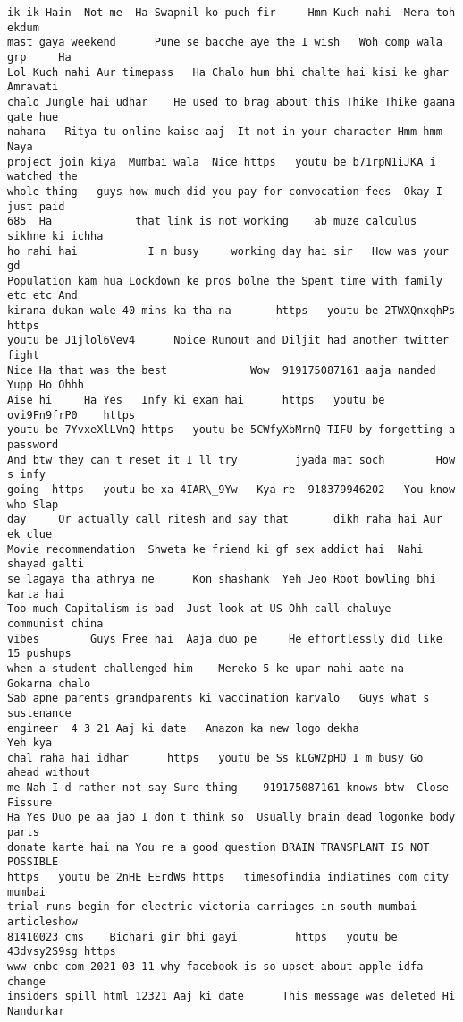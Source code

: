 \documentclass[11pt]{article}
\begin{document}
\begin{tcolorbox}[breakable, size=fbox, boxrule=.5pt, pad at break*=1mm, opacityfill=0]
\begin{Verbatim}[commandchars=\\\{\}]
ik ik Hain  Not me  Ha Swapnil ko puch fir     Hmm Kuch nahi  Mera toh ekdum
mast gaya weekend      Pune se bacche aye the I wish   Woh comp wala grp     Ha
Lol Kuch nahi Aur timepass   Ha Chalo hum bhi chalte hai kisi ke ghar Amravati
chalo Jungle hai udhar    He used to brag about this Thike Thike gaana gate hue
nahana   Ritya tu online kaise aaj  It not in your character Hmm hmm Naya
project join kiya  Mumbai wala  Nice https   youtu be b71rpN1iJKA i watched the
whole thing   guys how much did you pay for convocation fees  Okay I just paid
685  Ha             that link is not working    ab muze calculus sikhne ki ichha
ho rahi hai           I m busy     working day hai sir   How was your gd
Population kam hua Lockdown ke pros bolne the Spent time with family etc etc And
kirana dukan wale 40 mins ka tha na       https   youtu be 2TWXQnxqhPs https
youtu be J1jlol6Vev4      Noice Runout and Diljit had another twitter fight
Nice Ha that was the best             Wow  919175087161 aaja nanded Yupp Ho Ohhh
Aise hi     Ha Yes   Infy ki exam hai      https   youtu be ovi9Fn9frP0    https
youtu be 7YvxeXlLVnQ https   youtu be 5CWfyXbMrnQ TIFU by forgetting a password
And btw they can t reset it I ll try         jyada mat soch        How s infy
going  https   youtu be xa 4IAR\_9Yw   Kya re  918379946202   You know who Slap
day     Or actually call ritesh and say that       dikh raha hai Aur ek clue
Movie recommendation  Shweta ke friend ki gf sex addict hai  Nahi   shayad galti
se lagaya tha athrya ne      Kon shashank  Yeh Jeo Root bowling bhi karta hai
Too much Capitalism is bad  Just look at US Ohh call chaluye   communist china
vibes        Guys Free hai  Aaja duo pe     He effortlessly did like 15 pushups
when a student challenged him    Mereko 5 ke upar nahi aate na    Gokarna chalo
Sab apne parents grandparents ki vaccination karvalo   Guys what s sustenance
engineer  4 3 21 Aaj ki date   Amazon ka new logo dekha                Yeh kya
chal raha hai idhar      https   youtu be Ss kLGW2pHQ I m busy Go ahead without
me Nah I d rather not say Sure thing    919175087161 knows btw  Close Fissure
Ha Yes Duo pe aa jao I don t think so  Usually brain dead logonke body parts
donate karte hai na You re a good question BRAIN TRANSPLANT IS NOT POSSIBLE
https   youtu be 2nHE EErdWs https   timesofindia indiatimes com city mumbai
trial runs begin for electric victoria carriages in south mumbai articleshow
81410023 cms    Bichari gir bhi gayi         https   youtu be 43dvsy2S9sg https
www cnbc com 2021 03 11 why facebook is so upset about apple idfa change
insiders spill html 12321 Aaj ki date      This message was deleted Hi Nandurkar

\end{Verbatim}
\end{tcolorbox}
\end{document}
